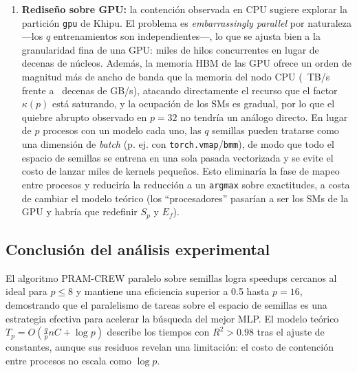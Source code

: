 \documentclass[11pt, a4paper]{article}
\begin{document}
\begin{enumerate}
    \item \textbf{Rediseño sobre GPU:} la contención observada en CPU sugiere explorar la partición \texttt{gpu} de Khipu. El problema es \textit{embarrassingly parallel} por naturaleza ---los $q$ entrenamientos son independientes---, lo que se ajusta bien a la granularidad fina de una GPU: miles de hilos concurrentes en lugar de decenas de núcleos. Además, la memoria HBM de las GPU ofrece un orden de magnitud más de ancho de banda que la memoria del nodo CPU (~TB/s frente a ~decenas de GB/s), atacando directamente el recurso que el factor $\kappa(p)$ está saturando, y la ocupación de los SMs es gradual, por lo que el quiebre abrupto observado en $p = 32$ no tendría un análogo directo. En lugar de $p$ procesos con un modelo cada uno, las $q$ semillas pueden tratarse como una dimensión de \textit{batch} (p. ej. con \texttt{torch.vmap}/\texttt{bmm}), de modo que todo el espacio de semillas se entrena en una sola pasada vectorizada y se evite el costo de lanzar miles de kernels pequeños. Esto eliminaría la fase de mapeo entre procesos y reduciría la reducción a un \texttt{argmax} sobre exactitudes, a costa de cambiar el modelo teórico (los ``procesadores'' pasarían a ser los SMs de la GPU y habría que redefinir $S_p$ y $E_f$).
\end{enumerate}

\subsection{Conclusión del análisis experimental}

El algoritmo PRAM-CREW paralelo sobre semillas logra speedups cercanos al ideal para $p \le 8$ y mantiene una eficiencia superior a 0.5 hasta $p = 16$, demostrando que el paralelismo de tareas sobre el espacio de semillas es una estrategia efectiva para acelerar la búsqueda del mejor MLP. El modelo teórico $T_p = O\!\left(\frac{q}{p} n C + \log p\right)$ describe los tiempos con $R^2 > 0.98$ tras el ajuste de constantes, aunque sus residuos revelan una limitación: el costo de contención entre procesos no escala como $\log p$.
\end{document}
